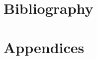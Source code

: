 \documentclass[11pt]{report}
\begin{document}



\part{Bibliography}



\part{Appendices}
\appendix


\end{document}
